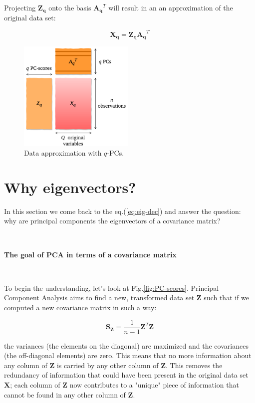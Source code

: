 \documentclass[10pt,twocolumn]{article}
\begin{document}
Projecting $\bm{Z_q}$ onto the basis $\bm{A_q}^T$ will result in an an approximation of the original data set:

\begin{equation} \label{eq:X-approximation}
\bm{X_q} = \bm{Z_q} \bm{A_q}^T
\end{equation}


\begin{figure}[H]
\centering\includegraphics[width=5.5cm]{data-approx.png}
\caption{Data approximation with $q$-PCs.}
\label{fig:data-approx}
\end{figure}




\section{Why eigenvectors?}

In this section we come back to the eq.(\ref{eq:eig-dec}) and answer the question: why are principal components the eigenvectors of a covariance matrix? 

\,\,
\,\,


\textbf{The goal of PCA in terms of a covariance matrix}

\,\,
\,\,

To begin the understanding, let's look at Fig.\ref{fig:PC-scores}. Principal Component Analysis aims to find a new, transformed data set $\bm{Z}$ such that if we computed a new covariance matrix in such a way:

\begin{equation}
\bm{S_Z} =  \frac{1}{n-1} \bm{Z}^T \bm{Z}
\end{equation}

the variances (the elements on the diagonal) are maximized and the covariances (the off-diagonal elements) are zero. This means that no more information about any column of $\bm{Z}$ is carried by any other column of $\bm{Z}$. This removes the redundancy of information that could have been present in the original data set $\bm{X}$; each column of $\bm{Z}$ now contributes to a "unique" piece of information that cannot be found in any other column of $\bm{Z}$.
\end{document}
